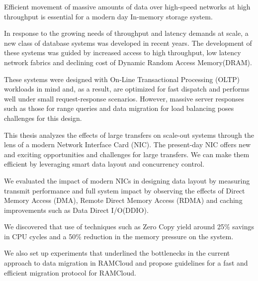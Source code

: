 


Efficient movement of massive amounts of data over high-speed networks at high 
throughput is essential for a modern day In-memory storage system.

In response to the growing needs of throughput and latency demands at scale, a new class of database systems was developed in recent years.
The development of these systems was guided by increased access to high throughput, low latency network fabrics and declining cost of Dynamic Random Access Memory(DRAM).

These systems were designed with On-Line Transactional Processing (OLTP) workloads in mind and, as a result, are optimized for fast dispatch and performs well under small
request-response scenarios. However, massive server responses such as those for range queries and data migration for load balancing poses challenges for this design.  

This thesis analyzes the effects of large transfers on scale-out systems through the lens of a modern Network Interface Card (NIC).
The present-day NIC offers new and exciting opportunities and challenges for large transfers.
We can make them efficient by leveraging smart data layout and concurrency control.

We evaluated the impact of modern NICs in designing data layout by measuring transmit performance and full system impact by observing the effects of Direct Memory Access (DMA), Remote Direct Memory Access (RDMA) and caching improvements such as Data Direct I/O\textregistered (DDIO). 

We discovered that use of techniques such as Zero Copy yield around 25\% savings in CPU cycles and a 50\% reduction in the memory pressure on the system. 

We also set up experiments that underlined the bottlenecks in the current approach to data migration in RAMCloud and propose guidelines for a fast and efficient migration protocol for RAMCloud.

